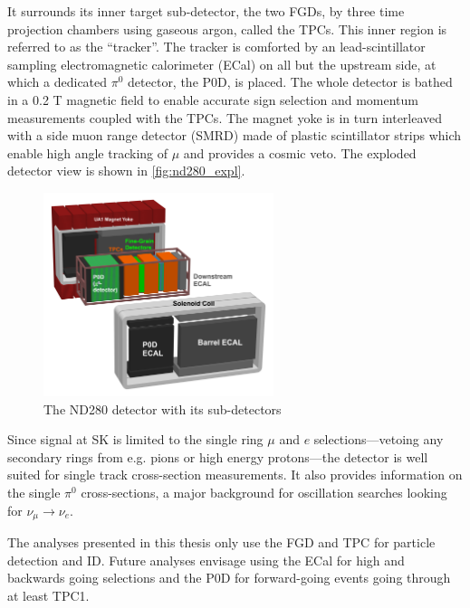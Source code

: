 It surrounds its inner target sub-detector, the two FGDs, by three time projection chambers using gaseous argon, called the TPCs. This inner region is referred to as the ``tracker''. The tracker is comforted by an lead-scintillator sampling electromagnetic calorimeter (ECal) on all but the upstream side, at which a dedicated $\pi^0$ detector, the P0D, is placed. The whole detector is bathed in a 0.2 T magnetic field to enable accurate sign selection and momentum measurements coupled with the TPCs. The magnet yoke is in turn interleaved with a side muon range detector (SMRD) made of plastic scintillator strips which enable high angle tracking of $\mu$ and provides a cosmic veto. The exploded detector view is shown in \autoref{fig:nd280_expl}.
\begin{figure}[h]
	\includegraphics[width=0.6\textwidth, trim={0mm 0mm 0mm 0mm}, clip,page=1]{figures/det_chap/view/ND280Exploded-Text-Transparent-Large}
	\caption{The ND280 detector with its sub-detectors}
	\label{fig:nd280_expl}
\end{figure}

Since signal at SK is limited to the single ring $\mu$ and $e$ selections---vetoing any secondary rings from e.g. pions or high energy protons---the detector is well suited for single track cross-section measurements. It also provides information on the single $\pi^0$ cross-sections, a major background for oscillation searches looking for $\nu_\mu \rightarrow \nu_e$.

The analyses presented in this thesis only use the FGD and TPC for particle detection and ID. Future analyses envisage using the ECal for high and backwards going selections and the P0D for forward-going events going through at least TPC1.

